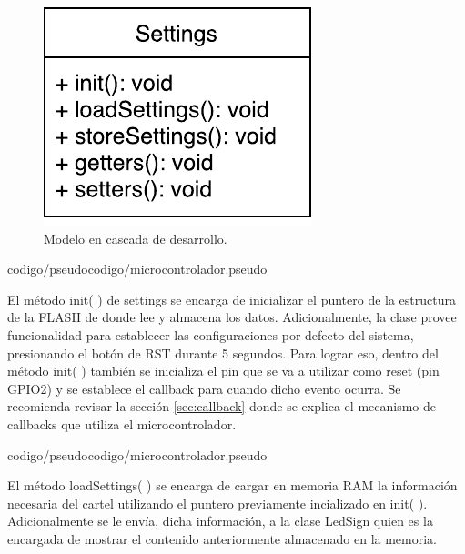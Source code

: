 \begin{figure}[!ht]
	\centering
	\includegraphics[width=0.8\linewidth]{imagenes/uml/settings.pdf}
	\caption{Modelo en cascada de desarrollo.}
	\label{uml:settings}
\end{figure}


{codigo/pseudocodigo/microcontrolador.pseudo}

El método init( ) de settings se encarga de inicializar el puntero de la estructura de la FLASH de donde lee y almacena los datos.
Adicionalmente, la clase provee funcionalidad para establecer las configuraciones por defecto del sistema, presionando el botón de RST durante 5 segundos.
Para lograr eso, dentro del método init( ) también se inicializa el pin que se va a utilizar como reset (pin GPIO2) y se establece el callback para cuando dicho evento ocurra.
Se recomienda revisar la sección \ref{sec:callback} donde se explica el mecanismo de callbacks que utiliza el microcontrolador.


{codigo/pseudocodigo/microcontrolador.pseudo}

El método loadSettings( ) se encarga de cargar en memoria RAM la información necesaria del cartel utilizando el puntero previamente incializado en init( ).
Adicionalmente se le envía, dicha información, a la clase LedSign quien es la encargada de mostrar el contenido anteriormente almacenado en la memoria.

